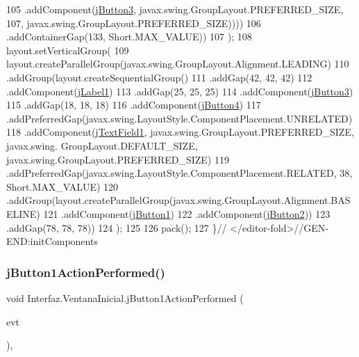\begin{DoxyCode}
105                             .addComponent(\mbox{\hyperlink{class_interfaz_1_1_ventana_inicial_af37a09af6b2d616c14a3d77d835eb34d}{jButton3}}, javax.swing.GroupLayout.PREFERRED\_SIZE, 107, 
      javax.swing.GroupLayout.PREFERRED\_SIZE))))
106                 .addContainerGap(133, Short.MAX\_VALUE))
107         );
108         layout.setVerticalGroup(
109             layout.createParallelGroup(javax.swing.GroupLayout.Alignment.LEADING)
110             .addGroup(layout.createSequentialGroup()
111                 .addGap(42, 42, 42)
112                 .addComponent(\mbox{\hyperlink{class_interfaz_1_1_ventana_inicial_a9d48c0b63de7cec55a4caed1f4feb13c}{jLabel1}})
113                 .addGap(25, 25, 25)
114                 .addComponent(\mbox{\hyperlink{class_interfaz_1_1_ventana_inicial_af37a09af6b2d616c14a3d77d835eb34d}{jButton3}})
115                 .addGap(18, 18, 18)
116                 .addComponent(\mbox{\hyperlink{class_interfaz_1_1_ventana_inicial_ad0c38a518bd73dd033484143f67a8c2b}{jButton4}})
117                 .addPreferredGap(javax.swing.LayoutStyle.ComponentPlacement.UNRELATED)
118                 .addComponent(\mbox{\hyperlink{class_interfaz_1_1_ventana_inicial_a45365129af4acf435140853b35aec365}{jTextField1}}, javax.swing.GroupLayout.PREFERRED\_SIZE, javax.swing.
      GroupLayout.DEFAULT\_SIZE, javax.swing.GroupLayout.PREFERRED\_SIZE)
119                 .addPreferredGap(javax.swing.LayoutStyle.ComponentPlacement.RELATED, 38, Short.MAX\_VALUE)
120                 .addGroup(layout.createParallelGroup(javax.swing.GroupLayout.Alignment.BASELINE)
121                     .addComponent(\mbox{\hyperlink{class_interfaz_1_1_ventana_inicial_a0c01fdde6aa59c4e947850d3d89ece3a}{jButton1}})
122                     .addComponent(\mbox{\hyperlink{class_interfaz_1_1_ventana_inicial_ac8ea3e51a862b7978b078d694528cdc5}{jButton2}}))
123                 .addGap(78, 78, 78))
124         );
125 
126         pack();
127     \}\textcolor{comment}{// </editor-fold>//GEN-END:initComponents}
\end{DoxyCode}
\mbox{\label{class_interfaz_1_1_ventana_inicial_a224f193d5ff7aa5f8e3cd5afcda55570}} 
\subsubsection{\texorpdfstring{j\+Button1\+Action\+Performed()}{jButton1ActionPerformed()}}
{\footnotesize\ttfamily void Interfaz.\+Ventana\+Inicial.\+j\+Button1\+Action\+Performed (\begin{DoxyParamCaption}\item[{java.\+awt.\+event.\+Action\+Event}]{evt }\end{DoxyParamCaption})\hspace{0.3cm}{\ttfamily [inline]}, {\ttfamily [private]}}


